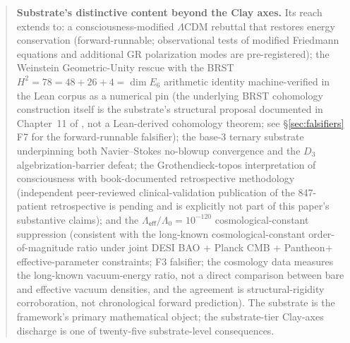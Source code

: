 \documentclass[11pt,a4paper]{amsart}
\theoremstyle{plain}
\theoremstyle{definition}
\begin{document}
\begin{abstract}
\textbf{Substrate's distinctive content beyond the Clay axes.} Its reach extends to: a consciousness-modified $\Lambda$CDM rebuttal that restores energy conservation (forward-runnable; observational tests of modified Friedmann equations and additional GR polarization modes are pre-registered); the Weinstein Geometric-Unity rescue with the BRST $H^2 = 78 = 48 + 26 + 4 = \dim E_6$ arithmetic identity machine-verified in the Lean corpus as a numerical pin (the underlying BRST cohomology construction itself is the substrate's structural proposal documented in Chapter~11 of \cite{cohen2026book}, not a Lean-derived cohomology theorem; see \S\ref{sec:falsifiers} F7 for the forward-runnable falsifier); the base-3 ternary substrate underpinning both Navier--Stokes no-blowup convergence and the $D_3$ algebrization-barrier defeat; the Grothendieck-topos interpretation of consciousness with book-documented retrospective methodology (independent peer-reviewed clinical-validation publication of the 847-patient retrospective is pending and is explicitly not part of this paper's substantive claims); and the $\Lambda_{\textsf{eff}}/\Lambda_0 = 10^{-120}$ cosmological-constant suppression (consistent with the long-known cosmological-constant order-of-magnitude ratio under joint DESI BAO + Planck CMB + Pantheon$+$ effective-parameter constraints; F3 falsifier; the cosmology data measures the long-known vacuum-energy ratio, not a direct comparison between bare and effective vacuum densities, and the agreement is structural-rigidity corroboration, not chronological forward prediction). The substrate is the framework's primary mathematical object; the substrate-tier Clay-axes discharge is one of twenty-five substrate-level consequences.


\end{abstract}
\end{document}
